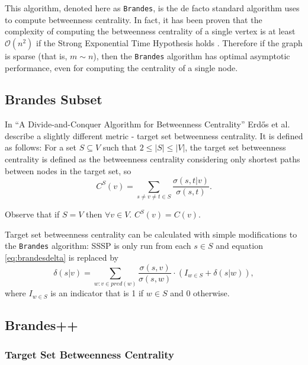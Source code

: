 \documentclass[12pt,a4paper,twoside,openright]{report}
\newcommand{\ttt}[1]{\texttt{#1}}
\newcommand{\erdos}{Erd\H{o}s }
\begin{document}
	This algorithm, denoted here as \ttt{Brandes}, is the de facto standard algorithm uses to compute betweenness centrality. In fact, it has been proven that the complexity of computing the betweenness centrality of a single vertex is at least $\mathcal{O}(n^2)$ if the Strong Exponential Time Hypothesis holds \cite{brandescomplexity}. Therefore if the graph is sparse (that is, $m \sim n$), then the \ttt{Brandes} algorithm has optimal asymptotic performance, even for computing the centrality of a single node.
	
	\subsection{Brandes Subset} \label{sec:brandessubset}
	In ``A Divide-and-Conquer Algorithm for Betweenness Centrality'' \cite{erdos} \erdos et al. describe a slightly different metric - target set betweenness centrality. It is defined as follows: For a set $S \subseteq V$ such that $2\leq |S| \leq |V|$, the target set betweenness centrality is defined as the betweenness centrality considering only shortest paths between nodes in the target set, so
	\begin{equation}\label{eq:subsetcentrality}
	C^S(v) = \sum_{s \neq v \neq t \in S} \frac{\sigma(s,t|v)}{\sigma(s,t)}.
	\end{equation}
	
	Observe that if $S = V$ then $\forall v \in V.$ $C^S(v) = C(v)$. 
	
	Target set betweenness centrality can be calculated with simple modifications to the \ttt{Brandes} algorithm: SSSP is only run from each $s \in S$ and equation \ref{eq:brandesdelta} is replaced by 
	\begin{equation} \label{eq:subsetdelta}
	\delta(s|v) = \sum_{w: v \in pred(w)} \frac{\sigma(s,v)}{\sigma(s,w)} \cdot (I_{w\in S}+\delta(s|w)),
	\end{equation}
	where $I_{w \in S}$ is an indicator that is 1 if $w \in S$ and 0 otherwise.
	
	\subsection{Brandes++} \label{sec:brandes++}
	
	\subsubsection{Target Set Betweenness Centrality} \label{sec:targetset}
	
\end{document}
